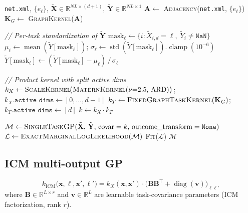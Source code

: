 \documentclass[11pt]{article}
\begin{document}
\begin{algorithm}[H]
\caption{\textsc{BuildGraphMultitaskGP}}
\begin{algorithmic}[1]
\Require \texttt{net.xml}, $\{e_\ell\}$, $\tilde{\mathbf{X}} \in \mathbb{R}^{NL \times (d+1)}$,
         $\tilde{\mathbf{Y}} \in \mathbb{R}^{NL \times 1}$
\State $\mathbf{A} \gets$ \textsc{Adjacency}(\texttt{net.xml}, $\{e_\ell\}$)
\State $\mathbf{K}_G \gets$ \textsc{GraphKernel}($\mathbf{A}$) 

\vspace{4pt}
\State \textit{// Per-task standardization of $\tilde{\mathbf{Y}}$}
    \State $\text{mask}_\ell \gets \bigl\{i : \tilde{X}_{i,d} = \ell,\; \tilde{Y}_i \neq \texttt{NaN}\bigr\}$
    \State $\mu_\ell \gets \operatorname{mean}(\tilde{Y}[\text{mask}_\ell])$;\quad
           $\sigma_\ell \gets \operatorname{std}(\tilde{Y}[\text{mask}_\ell]).\operatorname{clamp}(10^{-6})$
    \State $\tilde{Y}[\text{mask}_\ell] \gets (\tilde{Y}[\text{mask}_\ell] - \mu_\ell)\,/\,\sigma_\ell$
\EndFor

\vspace{4pt}
\State \textit{// Product kernel with split active dims}
\State $k_X \gets \textsc{ScaleKernel}\!\bigl(\textsc{MaternKernel}(\nu{=}2.5,\,\text{ARD})\bigr)$;\quad
       $k_X.\texttt{active\_dims} \gets [0,\dots,d{-}1]$
\State $k_T \gets \textsc{FixedGraphTaskKernel}(\mathbf{K}_G)$;\quad
       $k_T.\texttt{active\_dims} \gets [d]$
\State $k \gets k_X \cdot k_T$

\vspace{4pt}
\State $\mathcal{M} \gets \textsc{SingleTaskGP}(\tilde{\mathbf{X}},\, \tilde{\mathbf{Y}},\, \text{covar}=k,\,
       \text{outcome\_transform}=\texttt{None})$
\State $\mathcal{L} \gets \textsc{ExactMarginalLogLikelihood}(\mathcal{M})$
\State \textsc{Fit}($\mathcal{L}$) 
\State \Return $\mathcal{M}$
\end{algorithmic}
\end{algorithm}

\subsection{ICM multi-output GP}

\[
k_{\mathrm{ICM}}\!\bigl(\mathbf{x},\ell,\mathbf{x}',\ell'\bigr)
= k_X(\mathbf{x},\mathbf{x}') \cdot \bigl(\mathbf{B}\mathbf{B}^\top + \operatorname{diag}(\mathbf{v})\bigr)_{\ell\ell'}
\]
where $\mathbf{B} \in \mathbb{R}^{L\times r}$ and $\mathbf{v} \in \mathbb{R}^L$ are
learnable task-covariance parameters (ICM factorization, rank $r$).
\end{document}
